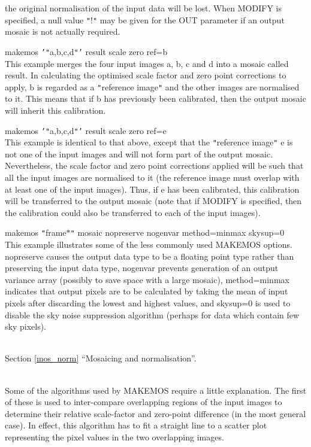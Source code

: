 \documentclass[twoside,11pt]{article}
\newcommand{\htmlref}[2]{#1}
\newcommand{\latexhtml}[2]{#1}
\renewcommand{\_}{\texttt{\symbol{95}}}
\newcommand{\qt}[1]{{\tt "}#1{\tt "}}
\newcommand{\qs}[1]{{\tt '}#1{\tt '}}
\newcommand{\routine}[1]{{\sc #1}}
\newcommand{\secref}[2]{\latexhtml{Section \ref{#1} ``#2''}{``\htmlref{#2}{#1}''}}
\newcommand{\sstexamplesubsection}[2]{\sloppy \item{\ssttt #1} \mbox{} \\ #2 }
\newcommand{\sstdiytopic}[2]{\item[#1:] \mbox{} \\[1.3ex] #2}
\newcommand{\sstexamplesubsection}[2]{\item[{\ssttt #1}] #2}
\newcommand{\sstdiytopic}[2]{\item[{#1:}] #2 }
\begin{document}
{{{         the original normalisation of the input data will be lost.
         When MODIFY is specified, a null value \qt{!} may be given for
         the OUT parameter if an output mosaic is not actually
         required.
      }
      \sstexamplesubsection{
         makemos \qs{\qt{a,b,c,d}} result scale zero ref=b
      } {
         This example merges the four input images a, b, c and d into a
         mosaic called result. In calculating the optimised scale
         factor and zero point corrections to apply, b is regarded as a
         \qt{reference image} and the other images are normalised to it. This
         means that if b has previously been calibrated, then the
         output mosaic will inherit this calibration.
      }
      \sstexamplesubsection{
         makemos \qs{\qt{a,b,c,d}} result scale zero ref=e
      } {
         This example is identical to that above, except that the
         \qt{reference image} e is not one of the input images and will not
         form part of the output mosaic. Nevertheless, the scale factor
         and zero point corrections applied will be such that all the
         input images are normalised to it (the reference image must
         overlap with at least one of the input images). Thus, if e has
         been calibrated, this calibration will be transferred to the
         output mosaic (note that if MODIFY is specified, then the
         calibration could also be transferred to each of the input
         images).
      }
      \sstexamplesubsection{
         makemos \qt{frame$*$} mosaic nopreserve nogenvar method=minmax
                 skysup=0
      } {
         This example illustrates some of the less commonly used
         \routine{MAKEMOS} options. nopreserve causes the output data type to be
         a floating point type rather than preserving the input data
         type, nogenvar prevents generation of an output variance array
         (possibly to save space with a large mosaic), method=minmax
         indicates that output pixels are to be calculated by taking
         the mean of input pixels after discarding the lowest and
         highest values, and skysup=0 is used to disable the sky noise
         suppression algorithm (perhaps for data which contain few sky
         pixels).
      }
   }
   \sstdiytopic{
      See also
   } {
      \secref{mos_norm}{Mosaicing and normalisation}.
   }
   \sstdiytopic{
      Algorithms Used
   } {
      Some of the algorithms used by \routine{MAKEMOS} require a little
      explanation.  The first of these is used to inter-compare
      overlapping regions of the input images to determine their relative
      scale-factor and zero-point difference (in the most general
      case). In effect, this algorithm has to fit a straight line to a
      scatter plot representing the pixel values in the two overlapping
      images.

}}
\end{document}
